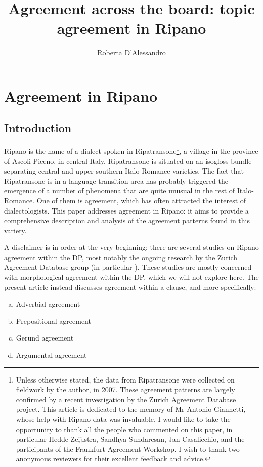 \documentclass[output=paper
,modfonts
,nonflat]{langsci/langscibook}
\title{Agreement across the board: topic agreement in Ripano}
\author{%
	Roberta D'Alessandro \affiliation{Utrecht University}
}
\begin{document}
	
\maketitle 

\section{Agreement in Ripano}  \label{sec-dalessandro:1} 
\subsection{Introduction}\label{sec-dalessandro:1.1}
Ripano is the name of a dialect spoken in Ripatransone\footnote{Unless otherwise stated, the data from Ripatransone were collected on fieldwork by the author, in 2007. These agreement patterns are largely confirmed by a recent investigation by the Zurich Agreement Database project. This article is dedicated to the memory of Mr Antonio Giannetti, whose help with Ripano data was invaluable. 
I would like to take the opportunity to thank all the people who commented on this paper, in particular Hedde Zeijlstra, Sandhya Sundaresan, Jan Casalicchio, and the participants of the Frankfurt Agreement Workshop. I wish to thank two anonymous reviewers for their excellent feedback and advice.}, a village in the province of Ascoli Piceno, in central Italy. Ripatransone is situated on an isogloss bundle separating central and upper-southern Italo-Romance varieties. The fact that Ripatransone is in a language-transition area has probably triggered the emergence of a number of phenomena that are quite unusual in the rest of Italo-Romance. One of them is agreement, which has often attracted the interest of dialectologists. This paper addresses agreement in Ripano: it aims to provide a comprehensive description and analysis of the agreement patterns found in this variety.

A disclaimer is in order at the very beginning: there are several studies on Ripano agreement within the DP, most notably the ongoing research by the Zurich Agreement Database group (in particular \citealt{Paciaroni_Loporcaro2018}). These studies are mostly concerned with morphological agreement within the DP, which we will not explore here. The present article instead discusses agreement within a clause, and more specifically:

\begin{enumerate}[a.]
\item Adverbial agreement
\item Prepositional agreement
\item Gerund agreement
\item Argumental agreement
\end{enumerate}
\end{document}
